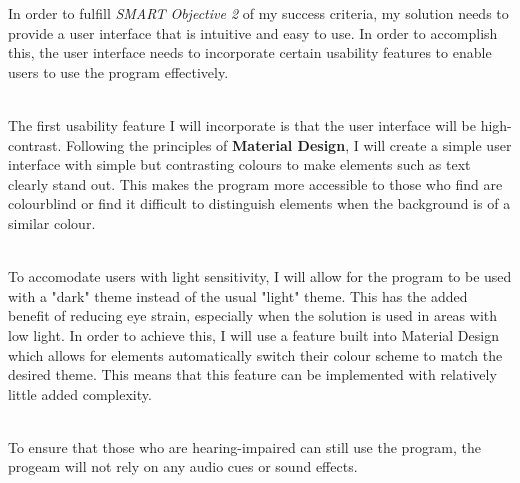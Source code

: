 \documentclass[../../main.tex]{subfiles}
\begin{document}
In order to fulfill \textit{SMART Objective 2} of my success criteria, my solution needs to provide a user interface
that is intuitive and easy to use. In order to accomplish this, the user interface needs
to incorporate certain usability features to enable users to use the program effectively.

\noindent \\ The first usability feature I will incorporate is that the user interface will
be high-contrast. Following the principles of \textbf{Material Design}, I will create a simple
user interface with simple but contrasting colours to make elements such as text
clearly stand out. This makes the program more accessible to those who find are colourblind
or find it difficult to distinguish elements when the background is of a similar colour.

\noindent \\ To accomodate users with light sensitivity, I will allow for the program to be
used with a "dark" theme instead of the usual "light" theme. This has the added benefit of
reducing eye strain, especially when the solution is used in areas with low light.
In order to achieve this, I will use a feature built into Material Design which allows
for elements automatically switch their colour scheme to match the desired theme. This
means that this feature can be implemented with relatively little added complexity.

\noindent \\ To ensure that those who are hearing-impaired can still use the program,
the progeam will not rely on any audio cues or sound effects.
\end{document}
